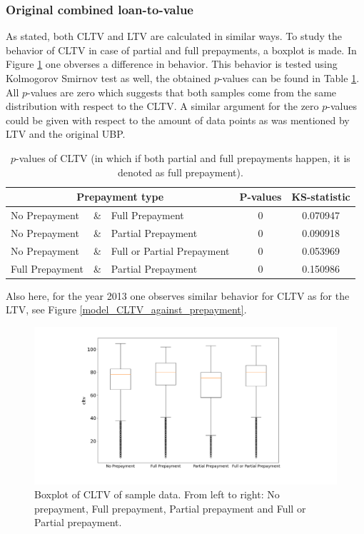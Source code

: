     \subsubsection{Original combined loan-to-value}
        As stated, both CLTV and LTV are calculated in similar ways. 
        To study the behavior of CLTV in case of partial and full 
        prepayments, a boxplot is made. In Figure \ref{model_boxplot_CLTV} 
        one obverses a difference in behavior. This behavior is tested 
        using Kolmogorov Smirnov test as well, the obtained $p$-values 
        can be found in Table \ref{model_Pvals_of_CLTV}. All $p$-values 
        are zero which suggests that both samples come from the 
        same distribution with respect to the CLTV. 
        A similar argument for the zero $p$-values could 
        be given with respect to the amount of data points as was mentioned 
        by LTV and the original UBP.
        \begin{table}[H]
        \centering
            \begin{tabular}{lcl|c|c}
                \multicolumn{3}{c|}{Prepayment type} 
                & P-values& KS-statistic \\\hline
                No Prepayment & \& & Full Prepayment & 0 & 0.070947\\
                No Prepayment & \& & Partial Prepayment & 0 & 0.090918\\
                No Prepayment & \& & Full or Partial Prepayment & 0 & 0.053969 \\
                Full Prepayment & \& & Partial Prepayment & 0 & 0.150986
		    \end{tabular}
            \caption{
                $p$-values of CLTV (in which if both partial and full 
                prepayments happen, it is denoted as full prepayment).
                }
	        \label{model_Pvals_of_CLTV}
        \end{table}
        Also here, for the year 2013 one observes similar behavior 
        for CLTV as for the LTV, see Figure \ref{model_CLTV_against_prepayment}. 
        \begin{figure}[H]
            \centering
            \includegraphics[width=\linewidth]{Figures/Boxplot_of_cltv_[2013, 2014, 2015, 2016, 2017, 2018, 2019, 2020]_.png}
            \caption{
                Boxplot of CLTV of sample data. From left to right: 
                No prepayment, Full prepayment, Partial prepayment 
                and Full or Partial prepayment.
                }
            \label{model_boxplot_CLTV}
        \end{figure}
